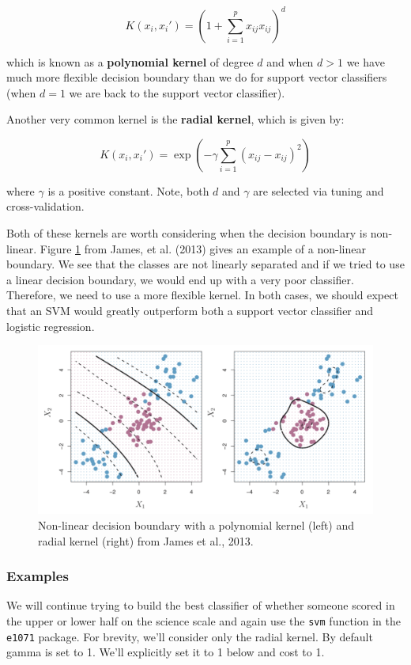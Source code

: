 \documentclass[]{book}
\begin{document}
\[
K(x_i, x_i') = (1 + \sum_{i = 1}^p x_{ij}x_{ij})^d
\]

which is known as a \textbf{polynomial kernel} of degree \(d\) and when \(d > 1\) we have much more flexible decision boundary than we do for support vector classifiers (when \(d = 1\) we are back to the support vector classifier).

Another very common kernel is the \textbf{radial kernel}, which is given by:

\[
K(x_i, x_i') = \exp\left(-\gamma \sum_{i = 1}^p (x_{ij} - x_{ij})^2\right)
\]

where \(\gamma\) is a positive constant. Note, both \(d\) and \(\gamma\) are selected via tuning and cross-validation.

Both of these kernels are worth considering when the decision boundary is non-linear. Figure \ref{fig:james2} from James, et al. (2013) gives an example of a non-linear boundary. We see that the classes are not linearly separated and if we tried to use a linear decision boundary, we would end up with a very poor classifier. Therefore, we need to use a more flexible kernel. In both cases, we should expect that an SVM would greatly outperform both a support vector classifier and logistic regression.

\begin{figure}
\includegraphics[width=1\linewidth]{images/james2} \caption{Non-linear decision boundary with a polynomial kernel (left) and radial kernel (right) from James et al., 2013.}\label{fig:james2}
\end{figure}

\hypertarget{examples}{%
\subsubsection{Examples}\label{examples}}

We will continue trying to build the best classifier of whether someone scored in the upper or lower half on the science scale and again use the \texttt{svm} function in the \texttt{e1071} package. For brevity, we'll consider only the radial kernel. By default gamma is set to 1. We'll explicitly set it to 1 below and cost to 1.
\end{document}
